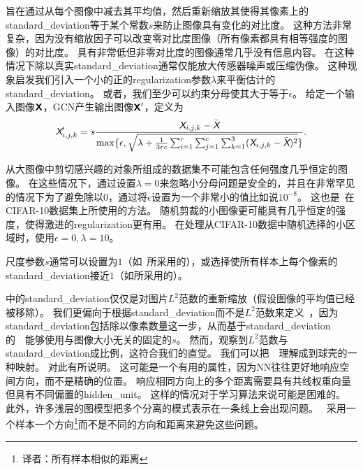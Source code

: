 旨在通过从每个图像中减去其平均值，然后重新缩放其使得其像素上的\gls{standard_deviation}等于某个常数$s$来防止图像具有变化的对比度。
这种方法非常复杂，因为没有缩放因子可以改变零对比度图像（所有像素都具有相等强度的图像）的对比度。
具有非常低但非零对比度的图像通常几乎没有信息内容。
在这种情况下除以真实\gls{standard_deviation}通常仅能放大传感器噪声或压缩伪像。
这种现象启发我们引入一个小的正的\gls{regularization}参数$\lambda$来平衡估计的\gls{standard_deviation}。
或者，我们至少可以约束分母使其大于等于$\epsilon$。
给定一个输入图像$\textsf{\textbf{X}}$，\gls{GCN}产生输出图像$\textsf{\textbf{X}}'$，定义为
\begin{align}
\label{eqn:123}
\textit{\textsf{X}}'_{i,j,k} = s\frac{\textit{\textsf{X}}_{i,j,k} - \bar{\textit{\textsf{X}}}}{\max\{ \epsilon, \sqrt{ \lambda + {\frac{1}{3rc}\sum_{i=1}^{r}\sum_{j=1}^{c}\sum_{k=1}^{3}} (\textit{\textsf{X}}_{i,j,k} - \bar{\textit{\textsf{X}}} )^2} \}}.
\end{align}


从大图像中剪切感兴趣的对象所组成的数据集不可能包含任何强度几乎恒定的图像。
在这些情况下，通过设置$\lambda = 0$来忽略小分母问题是安全的，并且在非常罕见的情况下为了避免除以$0$，通过将$\epsilon$设置为一个非常小的值比如说$10^{-8}$。
这也是~\citet{Goodfellow+al-arxiv-2013}在CIFAR-10数据集上所使用的方法。
随机剪裁的小图像更可能具有几乎恒定的强度，使得激进的\gls{regularization}更有用。
在处理从CIFAR-10数据中随机选择的小区域时，\citet{Coates2011}使用$\epsilon = 0, \lambda = 10$。

尺度参数$s$通常可以设置为$1$（如~\citet{Coates2011}所采用的），或选择使所有样本上每个像素的\gls{standard_deviation}接近$1$（如\citet{Goodfellow+al-arxiv-2013}所采用的）。


中的\gls{standard_deviation}仅仅是对图片$L^2$范数的重新缩放（假设图像的平均值已经被移除）。
我们更偏向于根据\gls{standard_deviation}而不是$L^2$范数来定义~，因为\gls{standard_deviation}包括除以像素数量这一步，从而基于\gls{standard_deviation}的~~能够使用与图像大小无关的固定的$s$。
然而，观察到$L^2$范数与\gls{standard_deviation}成比例，这符合我们的直觉。
我们可以把~~理解成到球壳的一种映射。
对此有所说明。
这可能是一个有用的属性，因为\gls{NN}往往更好地响应空间方向，而不是精确的位置。
响应相同方向上的多个距离需要具有共线权重向量但具有不同偏置的\gls{hidden_unit}。
这样的情况对于学习算法来说可能是困难的。
此外，许多浅层的图模型把多个分离的模式表示在一条线上会出现问题。
~采用一个样本一个方向\footnote{译者：所有样本相似的距离}而不是不同的方向和距离来避免这些问题。


